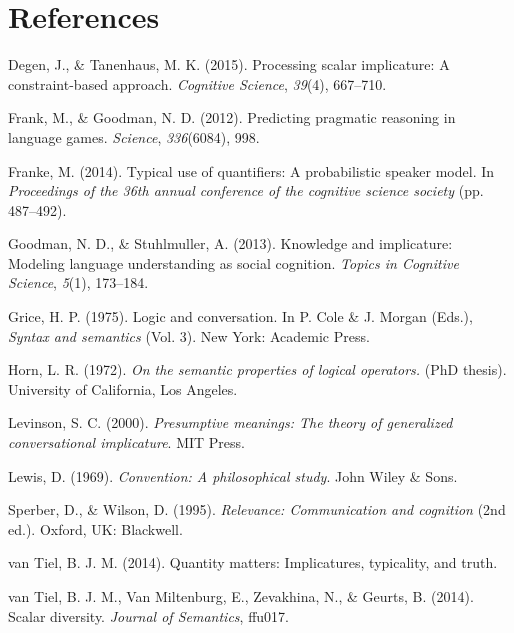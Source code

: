 \documentclass[10pt, letterpaper]{article}
\begin{document}
\section{References}\label{references}

\setlength{\parindent}{-0.1in} \setlength{\leftskip}{0.125in} \noindent

Degen, J., \& Tanenhaus, M. K. (2015). Processing scalar implicature: A
constraint-based approach. \emph{Cognitive Science}, \emph{39}(4),
667--710.

Frank, M., \& Goodman, N. D. (2012). Predicting pragmatic reasoning in
language games. \emph{Science}, \emph{336}(6084), 998.

Franke, M. (2014). Typical use of quantifiers: A probabilistic speaker
model. In \emph{Proceedings of the 36th annual conference of the
cognitive science society} (pp. 487--492).

Goodman, N. D., \& Stuhlmuller, A. (2013). Knowledge and implicature:
Modeling language understanding as social cognition. \emph{Topics in
Cognitive Science}, \emph{5}(1), 173--184.

Grice, H. P. (1975). Logic and conversation. In P. Cole \& J. Morgan
(Eds.), \emph{Syntax and semantics} (Vol. 3). New York: Academic Press.

Horn, L. R. (1972). \emph{On the semantic properties of logical
operators.} (PhD thesis). University of California, Los Angeles.

Levinson, S. C. (2000). \emph{Presumptive meanings: The theory of
generalized conversational implicature}. MIT Press.

Lewis, D. (1969). \emph{Convention: A philosophical study}. John Wiley
\& Sons.

Sperber, D., \& Wilson, D. (1995). \emph{Relevance: Communication and
cognition} (2nd ed.). Oxford, UK: Blackwell.

{van Tiel}, B. J. M. (2014). Quantity matters: Implicatures, typicality,
and truth.

{van Tiel}, B. J. M., Van Miltenburg, E., Zevakhina, N., \& Geurts, B.
(2014). Scalar diversity. \emph{Journal of Semantics}, ffu017.
\end{document}
